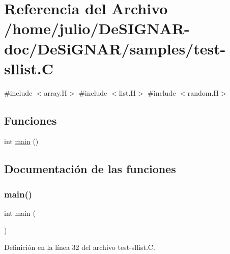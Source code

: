 \hypertarget{test-sllist_8_c}{}\section{Referencia del Archivo /home/julio/\+De\+S\+I\+G\+N\+A\+R-\/doc/\+De\+Si\+G\+N\+A\+R/samples/test-\/sllist.C}
\label{test-sllist_8_c}
{\ttfamily \#include $<$array.\+H$>$}\newline
{\ttfamily \#include $<$list.\+H$>$}\newline
{\ttfamily \#include $<$random.\+H$>$}\newline
\subsection*{Funciones}
\begin{DoxyCompactItemize}
\item 
int \hyperlink{test-sllist_8_c_ae66f6b31b5ad750f1fe042a706a4e3d4}{main} ()
\end{DoxyCompactItemize}


\subsection{Documentación de las funciones}
\mbox{\label{test-sllist_8_c_ae66f6b31b5ad750f1fe042a706a4e3d4}} 
\subsubsection{\texorpdfstring{main()}{main()}}
{\footnotesize\ttfamily int main (\begin{DoxyParamCaption}{ }\end{DoxyParamCaption})}



Definición en la línea 32 del archivo test-\/sllist.\+C.

